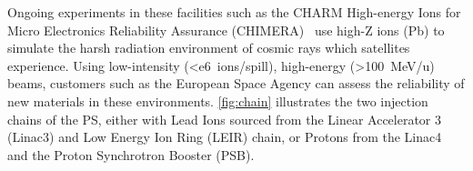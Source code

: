 \documentclass[11pt]{report}
\begin{document}
Ongoing experiments in these facilities such as the CHARM High-energy Ions for Micro Electronics Reliability Assurance (CHIMERA)~\cite{Fraser:feasibility} use high-Z ions (Pb) to simulate the harsh radiation environment of cosmic rays which satellites experience. Using low-intensity (\qty{<e6}{ions/spill}), high-energy (\qty{>100}{\MeV / u}) beams, customers such as the European Space Agency can assess the reliability of new materials in these environments. \autoref{fig:chain} illustrates the two injection chains of the PS, either with Lead Ions sourced from the Linear Accelerator 3 (Linac3) and Low Energy Ion Ring (LEIR) chain, or Protons from the Linac4 and the Proton Synchrotron Booster (PSB).

\begin{figure}

  \begin{tikzpicture}[x=0.75pt,y=0.75pt,yscale=-1,xscale=1]
  

\end{tikzpicture}
\end{figure}
\end{document}
